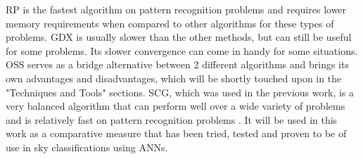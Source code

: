 RP is the fastest algorithm on pattern recognition problems and requires lower memory requirements when compared to other algorithms for these types of problems. GDX is usually slower than the other methods, but can still be useful for some problems. Its slower convergence can come in handy for some situations. OSS serves as a bridge alternative between 2 different algorithms and brings its own advantages and disadvantages, which will be shortly touched upon in the "Techniques and Tools" sections. SCG, which was used in the previous work, is a very balanced algorithm that can perform well over a wide variety of problems and is relatively fast on pattern recognition problems \cite{matlab:tfunc}. It will be used in this work as a comparative measure that has been tried, tested and proven to be of use in sky classifications using ANNs.